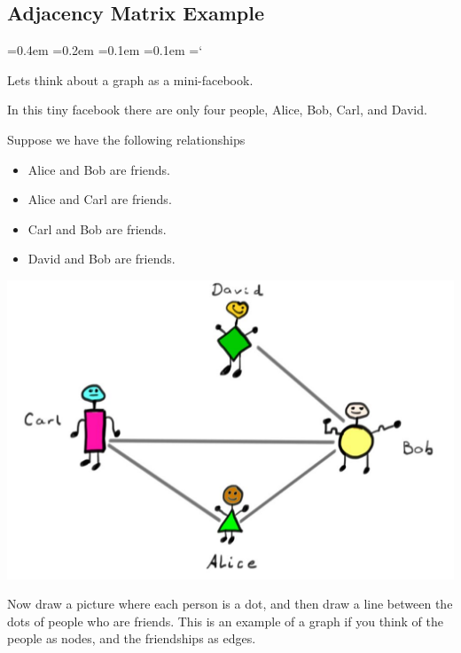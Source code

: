 
\subsection*{Adjacency Matrix Example}

{\ttfamily
{}\font=0.4em
\font=0.2em
\font=0.1em
\font=0.1em
\hyphenchar\font=`\-


\hypertarget{scripts_matrices_example}{Lets think about a graph as a mini-facebook.} In this tiny facebook there are only four people, Alice, Bob, Carl, and David. 

Suppose we have the following relationships
\begin{itemize}
\item Alice and Bob are friends.
\item Alice and Carl are friends.
\item Carl and Bob are friends.
\item David and Bob are friends.
\end{itemize}

\begin{center}
\includegraphics[alt={As explained below the dots Alice, Bob, and Carol are connected to each other.  The dots Bob and David are connected.},scale=.25]{facebook.jpg}
\end{center}

Now draw a picture where each person is a dot, and then draw a line between the dots of people who are friends. This is an example of a graph if you think of the people as nodes, and the friendships as edges.

}
